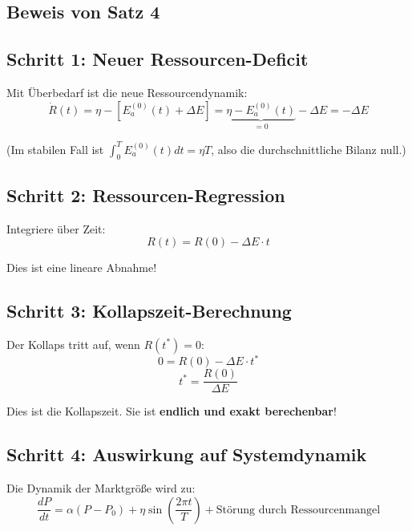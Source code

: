 \documentclass[a4paper, 12pt, twoside, openright]{report}
\theoremstyle{definition}
\theoremstyle{definition}
\begin{document}
\subsection{Beweis von Satz 4}

\subsection{Schritt 1: Neuer Ressourcen-Deficit}

Mit Überbedarf ist die neue Ressourcendynamik:
\begin{equation}
    \dot{R}(t) = \eta - [E_a^{(0)}(t) + \Delta E] = \underbrace{\eta - E_a^{(0)}(t)}_{=0} - \Delta E = -\Delta E
\end{equation}

(Im stabilen Fall ist $\int_0^T E_a^{(0)}(t) dt = \eta T$, also die durchschnittliche Bilanz null.)

\subsection{Schritt 2: Ressourcen-Regression}

Integriere über Zeit:
\begin{equation}
    R(t) = R(0) - \Delta E \cdot t
\end{equation}

Dies ist eine lineare Abnahme!

\subsection{Schritt 3: Kollapszeit-Berechnung}

Der Kollaps tritt auf, wenn $R(t^*) = 0$:
\begin{equation}
    0 = R(0) - \Delta E \cdot t^*
\end{equation}
\begin{equation}
    t^* = \frac{R(0)}{\Delta E}
\end{equation}

Dies ist die Kollapszeit. Sie ist \textbf{endlich und exakt berechenbar}!

\subsection{Schritt 4: Auswirkung auf Systemdynamik}

Die Dynamik der Marktgröße wird zu:
\begin{equation}
    \frac{dP}{dt} = \alpha(P - P_0) + \eta \sin\left(\frac{2\pi t}{T}\right) + \text{Störung durch Ressourcenmangel}
\end{equation}
\end{document}
